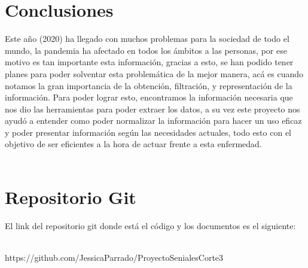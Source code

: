 \documentclass[conference,compsoc,onecolumn]{IEEEtran}
\begin{document}
\section{Conclusiones}
\label{sec:conclusions}
Este año (2020) ha llegado con muchos problemas para la sociedad de todo el mundo, la pandemia ha afectado en todos los ámbitos a las personas, por ese motivo es tan importante esta información, gracias a esto, se han podido tener planes para poder solventar esta problemática de la mejor manera, acá es cuando notamos la gran importancia de la obtención, filtración, y representación de la información. Para poder lograr esto, encontramos la información necesaria que nos dio las herramientas para poder extraer los datos, a su vez este proyecto nos ayudó a entender como poder normalizar la información para hacer un uso eficaz y poder presentar información según las necesidades actuales, todo esto con el objetivo de ser eficientes a la hora de actuar frente a esta enfermedad.
\\\

\section{Repositorio Git}
\label{sec:Repositorio}

El link del repositorio git donde está el código y los documentos es el siguiente:
\\\

https://github.com/JessicaParrado/ProyectoSenialesCorte3
\\\

\\\
\nocite{*}

\label{sec:biblio}
 





\end{document}
